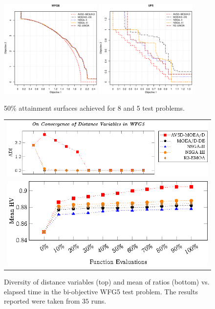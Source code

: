 \begin{figure}[t]
\centering
\includegraphics[width=0.45\textwidth]{images/WFG8_2.eps} 
\includegraphics[width=0.45\textwidth]{images/UF5_2.eps}
\caption{50\% attainment surfaces achieved for \WFG{}8 and \UF{}5 test problems.}\label{fig:attainment}
\end{figure}


\begin{figure}[t]
\centering
\begin{tabular}{l}
 \includegraphics[scale=1.15]{images/Diversity_Long_Term_tikz_WFG5-figure0.eps}\\[0cm]%
\includegraphics[scale=1.15]{images/Diversity_Long_Term_tikz_WFG5-figure1.eps}\\[0cm]%
\end{tabular}
\caption{Diversity of distance variables (top) and mean of \HV{} ratios (bottom) vs. elapsed time in the bi-objective WFG5 test problem. The results reported were taken from $35$ runs.}\label{fig:WFG5_Diversity}
\end{figure}


